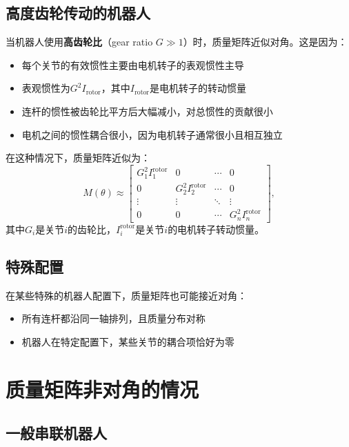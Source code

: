 \documentclass{article}
\begin{document}
\subsection{高度齿轮传动的机器人}

当机器人使用\textbf{高齿轮比}（gear ratio $G \gg 1$）时，质量矩阵近似对角。这是因为：

\begin{itemize}
\item 每个关节的有效惯性主要由电机转子的表观惯性主导
\item 表观惯性为$G^2 I_{\text{rotor}}$，其中$I_{\text{rotor}}$是电机转子的转动惯量
\item 连杆的惯性被齿轮比平方后大幅减小，对总惯性的贡献很小
\item 电机之间的惯性耦合很小，因为电机转子通常很小且相互独立
\end{itemize}

在这种情况下，质量矩阵近似为：
\begin{equation}
M(\theta) \approx \begin{bmatrix}
G_1^2 I_1^{\text{rotor}} & 0 & \cdots & 0 \\
0 & G_2^2 I_2^{\text{rotor}} & \cdots & 0 \\
\vdots & \vdots & \ddots & \vdots \\
0 & 0 & \cdots & G_n^2 I_n^{\text{rotor}}
\end{bmatrix},
\end{equation}
其中$G_i$是关节$i$的齿轮比，$I_i^{\text{rotor}}$是关节$i$的电机转子转动惯量。

\subsection{特殊配置}

在某些特殊的机器人配置下，质量矩阵也可能接近对角：

\begin{itemize}
\item 所有连杆都沿同一轴排列，且质量分布对称
\item 机器人在特定配置下，某些关节的耦合项恰好为零
\end{itemize}

\section{质量矩阵非对角的情况}

\subsection{一般串联机器人}
\end{document}
